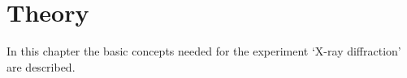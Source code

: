  
\chapter{Theory}
\label{cha:theory}

In this chapter the basic concepts needed for the experiment `X-ray diffraction' are described.








